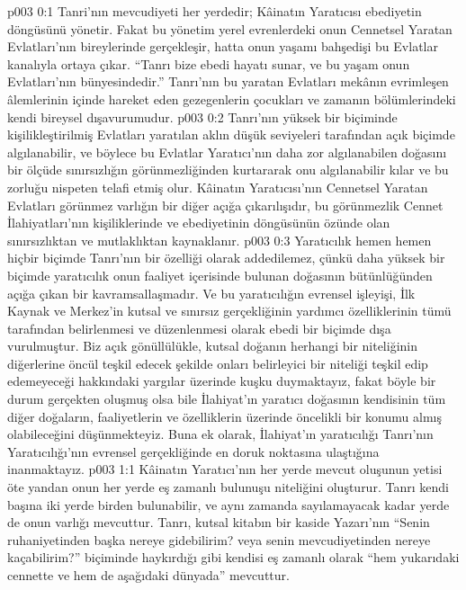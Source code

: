 \vs p003 0:1 Tanri’nın mevcudiyeti her yerdedir; Kâinatın Yaratıcısı ebediyetin döngüsünü yönetir. Fakat bu yönetim yerel evrenlerdeki onun Cennetsel Yaratan Evlatları’nın bireylerinde gerçekleşir, hatta onun yaşamı bahşedişi bu Evlatlar kanalıyla ortaya çıkar. “Tanrı bize ebedi hayatı sunar, ve bu yaşam onun Evlatları’nın bünyesindedir.” Tanrı’nın bu yaratan Evlatları mekânın evrimleşen âlemlerinin içinde hareket eden gezegenlerin çocukları ve zamanın bölümlerindeki kendi bireysel dışavurumudur.
\vs p003 0:2 Tanrı’nın yüksek bir biçiminde kişilikleştirilmiş Evlatları yaratılan aklın düşük seviyeleri tarafından açık biçimde algılanabilir, ve böylece bu Evlatlar Yaratıcı’nın daha zor algılanabilen doğasını bir ölçüde sınırsızlığın görünmezliğinden kurtararak onu algılanabilir kılar ve bu zorluğu nispeten telafi etmiş olur. Kâinatın Yaratıcısı’nın Cennetsel Yaratan Evlatları görünmez varlığın bir diğer açığa çıkarılışıdır, bu görünmezlik Cennet İlahiyatları’nın kişiliklerinde ve ebediyetinin döngüsünün özünde olan sınırsızlıktan ve mutlaklıktan kaynaklanır.
\vs p003 0:3 Yaratıcılık hemen hemen hiçbir biçimde Tanrı’nın bir özelliği olarak addedilemez, çünkü daha yüksek bir biçimde yaratıcılık onun faaliyet içerisinde bulunan doğasının bütünlüğünden açığa çıkan bir kavramsallaşmadır. Ve bu yaratıcılığın evrensel işleyişi, İlk Kaynak ve Merkez’in kutsal ve sınırsız gerçekliğinin yardımcı özelliklerinin tümü tarafından belirlenmesi ve düzenlenmesi olarak ebedi bir biçimde dışa vurulmuştur. Biz açık gönüllülükle, kutsal doğanın herhangi bir niteliğinin diğerlerine öncül teşkil edecek şekilde onları belirleyici bir niteliği teşkil edip edemeyeceği hakkındaki yargılar üzerinde kuşku duymaktayız, fakat böyle bir durum gerçekten oluşmuş olsa bile İlahiyat’ın yaratıcı doğasının kendisinin tüm diğer doğaların, faaliyetlerin ve özelliklerin üzerinde öncelikli bir konumu almış olabileceğini düşünmekteyiz. Buna ek olarak, İlahiyat’ın yaratıcılığı Tanrı’nın Yaratıcılığı’nın evrensel gerçekliğinde en doruk noktasına ulaştığına inanmaktayız.
\vs p003 1:1 Kâinatın Yaratıcı’nın her yerde mevcut oluşunun yetisi öte yandan onun her yerde eş zamanlı bulunuşu niteliğini oluşturur. Tanrı kendi başına iki yerde birden bulunabilir, ve aynı zamanda sayılamayacak kadar yerde de onun varlığı mevcuttur. Tanrı, kutsal kitabın bir kaside Yazarı’nın “Senin ruhaniyetinden başka nereye gidebilirim? veya senin mevcudiyetinden nereye kaçabilirim?” biçiminde haykırdığı gibi kendisi eş zamanlı olarak “hem yukarıdaki cennette ve hem de aşağıdaki dünyada” mevcuttur.
